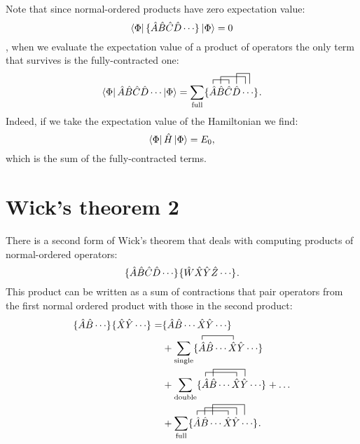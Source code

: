 \documentclass[../Main/chem532-notes.tex]{subfiles}
\begin{document}
Note that since normal-ordered products have zero expectation value:
\begin{equation}
\bra{\Phi} \{{\hat{A} \hat{B} \hat{C} \hat{D}\cdots }\}_{}\ket{\Phi} = 0
\end{equation},
when we evaluate the expectation value of a product of operators the only term that survives is the fully-contracted one:
\begin{equation}
\bra{\Phi} \hat{A} \hat{B} \hat{C} \hat{D}\cdots \ket{\Phi} = 
\sum_\mathrm{full}
\no{
\contraction{}{\hat{A}}{\hat{B}}{\hat{C}}
\contraction[1.75ex]{\hat{A}}{\hat{B}}{\hat{C}\hat{D}}{\hat{D}}
\contraction[2.5ex]{\hat{A}\hat{B}\hat{C}}{\hat{D}}{\hat{D}}{}
\hat{A}\hat{B}\hat{C}\hat{D}\cdots}.
\end{equation}
Indeed, if we take the expectation value of the Hamiltonian we find:
\begin{equation}
\bra{\Phi} \hat{H} \ket{\Phi} = E_0,
\end{equation}
which is the sum of the fully-contracted terms.

\section{Wick's theorem 2}
There is a second form of Wick's theorem that deals with computing products of normal-ordered operators:
\begin{equation}
\{{\hat{A} \hat{B} \hat{C} \hat{D}\cdots }\}_{} \{{\hat{W} \hat{X} \hat{Y} \hat{Z}\cdots }\}_{}.
\end{equation}
This product can be written as a sum of contractions that pair operators from the first normal ordered product with those in the second product:
\begin{equation}
\begin{split}
\no{\hat{A} \hat{B} \cdots } \no{\hat{X} \hat{Y} \cdots }
=&
\no{\hat{A} \hat{B} \cdots \hat{X} \hat{Y} \cdots } \\
&+
\sum_\mathrm{single}
\no{
\contraction{}{\hat{A}}{\hat{B}\cdots}{\hat{X}}
\hat{A} \hat{B} \cdots \hat{X} \hat{Y} \cdots } \\
&+
\sum_\mathrm{double}
\no{
\contraction{}{\hat{A}}{\hat{B}\cdots}{\hat{X}}
\contraction[1.75ex]{\hat{A}}{\hat{B}}{\cdots\hat{X}}{\hat{Y}}
\hat{A} \hat{B} \cdots \hat{X} \hat{Y} \cdots }
+ \ldots \\
&+ \sum_\mathrm{full}
\no{
\contraction{}{\hat{A}}{\hat{B}\cdots}{\hat{X}}
\contraction[1.75ex]{\hat{A}}{\hat{B}}{\cdots\hat{X}}{\hat{Y}}
\contraction[2.5ex]{\hat{A}\hat{B}}{\hat{B}}{\cdots\hat{X}}{\hat{Y}}
\hat{A} \hat{B} \cdots \hat{X} \hat{Y} \cdots }.
\end{split}
\end{equation}
\end{document}
